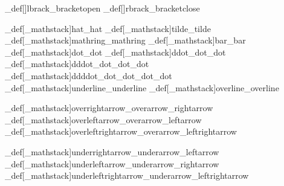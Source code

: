 \brl@char_def[]{lbrack}{\brl@char@alias_bracketopen}
\brl@char_def[]{rbrack}{\brl@char@alias_bracketclose}






\brl@char_def[\brl@char_mathstack{}{}]{hat}{\brl@char@alias_hat}
\brl@char_def[\brl@char_mathstack{}{}]{tilde}{\brl@char@alias_tilde}
\brl@char_def[\brl@char_mathstack{}{}]{mathring}{\brl@char@alias_mathring}
\brl@char_def[\brl@char_mathstack{}{}]{bar}{\brl@char@alias_bar}
\brl@char_def[\brl@char_mathstack{}{}]{dot}{\brl@char@alias_dot}
\brl@char_def[\brl@char_mathstack{}{}]{ddot}{\brl@char@alias_dot\brl@char@alias_dot}
\brl@char_def[\brl@char_mathstack{}{}]{dddot}{\brl@char@alias_dot\brl@char@alias_dot\brl@char@alias_dot}
\brl@char_def[\brl@char_mathstack{}{}]{ddddot}{\brl@char@alias_dot\brl@char@alias_dot\brl@char@alias_dot\brl@char@alias_dot}
\brl@char_def[\brl@char_mathstack{}{}]{underline}{\brl@char@alias_underline}
\brl@char_def[\brl@char_mathstack{}{}]{overline}{\brl@char@alias_overline}

\brl@char_def[\brl@char_mathstack{}{}]{overrightarrow}{\brl@char@alias_overarrow\brl@char@alias_rightarrow}
\brl@char_def[\brl@char_mathstack{}{}]{overleftarrow}{\brl@char@alias_overarrow\brl@char@alias_leftarrow}
\brl@char_def[\brl@char_mathstack{}{}]{overleftrightarrow}{\brl@char@alias_overarrow\brl@char@alias_leftrightarrow}


\brl@char_def[\brl@char_mathstack{}{}]{underrightarrow}{\brl@char@alias_underarrow\brl@char@alias_leftarrow}
\brl@char_def[\brl@char_mathstack{}{}]{underleftarrow}{\brl@char@alias_underarrow\brl@char@alias_rightarrow}
\brl@char_def[\brl@char_mathstack{}{}]{underleftrightarrow}{\brl@char@alias_underarrow\brl@char@alias_leftrightarrow}



